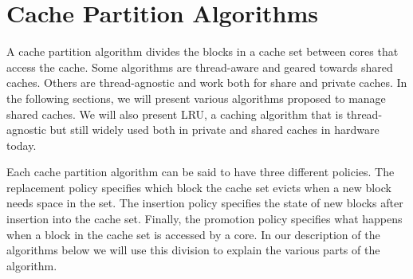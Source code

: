 
\section{Cache Partition Algorithms}
\label{sec:background:algorithms}


A cache partition algorithm divides the blocks in a cache set between cores that access the cache.
Some algorithms are thread-aware and geared towards shared caches.
Others are thread-agnostic and work both for share and private caches.
In the following sections, we will present various algorithms proposed to manage shared caches.
We will also present LRU, a caching algorithm that is thread-agnostic but still widely used both in private and shared caches in hardware today.

Each cache partition algorithm can be said to have three different policies.
The replacement policy specifies which block the cache set evicts when a new block needs space in the set.
The insertion policy specifies the state of new blocks after insertion into  the cache set.
Finally, the promotion policy specifies what happens when a block in the cache set is accessed by a core.
In our description of the algorithms below we will use this division to explain the various parts of the algorithm.





